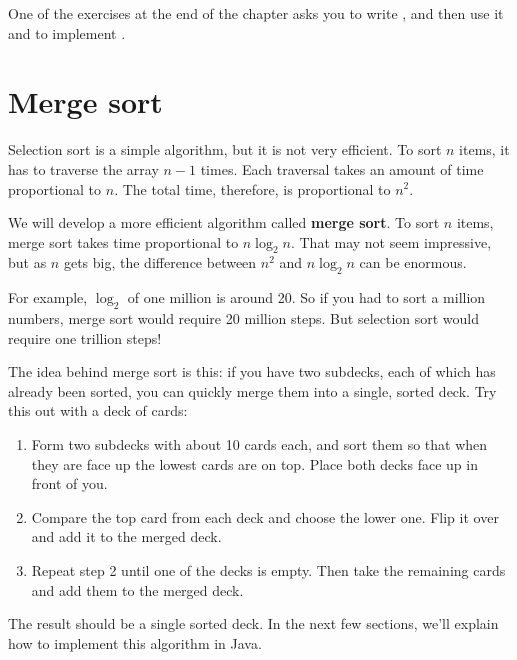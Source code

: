 One of the exercises at the end of the chapter asks you to write , and then use it and  to implement .


\section{Merge sort}
\label{mergesort}


Selection sort is a simple algorithm, but it is not very efficient.
To sort $n$ items, it has to traverse the array $n-1$ times.
Each traversal takes an amount of time proportional to $n$.
The total time, therefore, is proportional to $n^2$.


We will develop a more efficient algorithm called {\bf merge sort}.
To sort $n$ items, merge sort takes time proportional to $n \log_2 n$.
That may not seem impressive, but as $n$ gets big, the difference between $n^2$ and $n \log_2 n$ can be enormous.

For example, $\log_2$ of one million is around 20.
So if you had to sort a million numbers, merge sort would require 20 million steps.
But selection sort would require one trillion steps!

The idea behind merge sort is this: if you have two subdecks, each of which has already been sorted, you can quickly merge them into a single, sorted deck.
Try this out with a deck of cards:

\begin{enumerate}

\item Form two subdecks with about 10 cards each, and sort them so that when they are face up the lowest cards are on top.
Place both decks face up in front of you.

\item Compare the top card from each deck and choose the lower one.
Flip it over and add it to the merged deck.

\item Repeat step 2 until one of the decks is empty.
Then take the remaining cards and add them to the merged deck.

\end{enumerate}

The result should be a single sorted deck.
In the next few sections, we'll explain how to implement this algorithm in Java.


